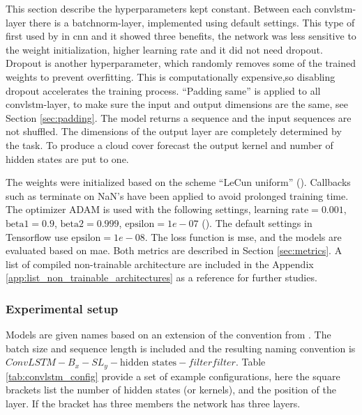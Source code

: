This section describe the hyperparameters kept constant. Between each \acrshort{convlstm}-layer there is a \acrfull{batchnorm}-layer, implemented using default settings. This type of %
first used by  in \acrshort{cnn} and it showed three benefits, the network was less sensitive to the weight initialization, higher learning rate and it did not need dropout. Dropout is another hyperparameter, which randomly removes some of the trained weights to prevent overfitting. This is computationally expensive,so disabling dropout accelerates the training process.
``Padding same'' is applied to all \acrshort{convlstm}-layer, to make sure the input and output dimensions are the same, see Section \ref{sec:padding}. The model returns a sequence and the input sequences are not shuffled. 
The dimensions of the output layer are completely determined by the task. To produce a cloud cover forecast the output kernel and number of hidden states are put to one.

The weights were initialized based on the scheme ``LeCun uniform''  (\cite{Lecun98efficientbackprop}). Callbacks such as %
terminate on NaN's have been applied to avoid prolonged training time. The optimizer ADAM is used with the following settings, $\text{learning rate}=0.001$, $\text{beta1}=0.9$, $\text{beta2}=0.999$, $\text{epsilon}=1e-07$ (\cite{Kingma2015Adam:Optimization}). The default settings in Tensorflow use $\text{epsilon}=1e-08$. The loss function is \acrfull{mse}, and the models are evaluated based on \acrfull{mae}. Both metrics are described in Section \ref{sec:metrics}. 
A list of compiled non-trainable architecture are included in the Appendix \ref{app:list_non_trainable_architectures} as a reference for further studies.

\subsubsection{Experimental setup}
Models are given names based on an extension of the convention from .
The batch size and sequence length is included and 
the resulting naming convention is  $ConvLSTM-B_{x}-SL_{y}-\text{hidden states}-filter$\times$filter$. Table \ref{tab:convlstm_config} provide a set of example configurations, here the square brackets list the number of hidden states (or kernels), and the position of the layer. If the bracket has three members the network has three layers. %


